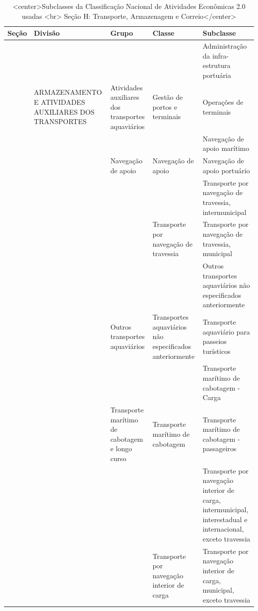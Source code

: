 \documentclass[
]{article}
\begin{document}
\begin{table}

\caption{\label{tab:tabela1}<center>Subclasses da Classificação Nacional de Atividades Econômicas 2.0 usadas <br> Seção H: Transporte, Armazenagem e Correio</center>}
\centering
\begin{tabular}[t]{>{}lllll}
\toprule
Seção & Divisão & Grupo & Classe & Subclasse\\
\midrule
 &  &  &  & Administração da infra-estrutura portuária\\
\cmidrule{5-5}
 & \multirow[t]{-2}{*}{\raggedright\arraybackslash ARMAZENAMENTO E ATIVIDADES AUXILIARES DOS TRANSPORTES} & \multirow[t]{-2}{*}{\raggedright\arraybackslash Atividades auxiliares dos transportes aquaviários} & \multirow[t]{-2}{*}{\raggedright\arraybackslash Gestão de portos e terminais} & Operações de terminais\\
\cmidrule{2-5}
 &  &  &  & Navegação de apoio marítimo\\
\cmidrule{5-5}
 &  & \multirow[t]{-2}{*}{\raggedright\arraybackslash Navegação de apoio} & \multirow[t]{-2}{*}{\raggedright\arraybackslash Navegação de apoio} & Navegação de apoio portuário\\
\cmidrule{3-5}
 &  &  &  & Transporte por navegação de travessia, intermunicipal\\
\cmidrule{5-5}
 &  &  & \multirow[t]{-2}{*}{\raggedright\arraybackslash Transporte por navegação de travessia} & Transporte por navegação de travessia, municipal\\
\cmidrule{4-5}
 &  &  &  & Outros transportes aquaviários não especificados anteriormente\\
\cmidrule{5-5}
 &  & \multirow[t]{-4}{*}{\raggedright\arraybackslash Outros transportes aquaviários} & \multirow[t]{-2}{*}{\raggedright\arraybackslash Transportes aquaviários não especificados anteriormente} & Transporte aquaviário para passeios turísticos\\
\cmidrule{3-5}
 &  &  &  & Transporte marítimo de cabotagem - Carga\\
\cmidrule{5-5}
 &  & \multirow[t]{-2}{*}{\raggedright\arraybackslash Transporte marítimo de cabotagem e longo curso} & \multirow[t]{-2}{*}{\raggedright\arraybackslash Transporte marítimo de cabotagem} & Transporte marítimo de cabotagem - passageiros\\
\cmidrule{3-5}
 &  &  &  & Transporte por navegação interior de carga, intermunicipal, interestadual e internacional, exceto travessia\\
\cmidrule{5-5}
 &  &  & \multirow[t]{-2}{*}{\raggedright\arraybackslash Transporte por navegação interior de carga} & Transporte por navegação interior de carga, municipal, exceto travessia\\

\end{tabular}
\end{table}
\end{document}
